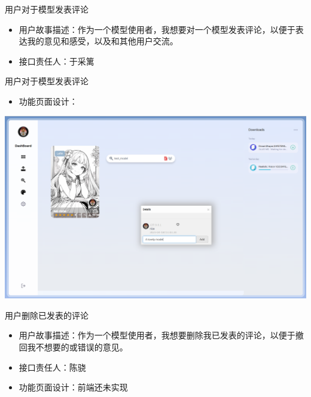 \begin{frame}{用户对于模型发表评论}
    \begin{itemize}
        \item 用户故事描述：作为一个模型使用者，我想要对一个模型发表评论，以便于表达我的意见和感受，以及和其他用户交流。
        \item 接口责任人：于采篱
    \end{itemize}
\end{frame}

\begin{frame}{用户对于模型发表评论}
    \begin{itemize}
        \item 功能页面设计：
    \end{itemize}
    \includegraphics[width=1\textwidth]{contents/figure/user_stories_demo_add_comment.png}
\end{frame}

\begin{frame}{用户删除已发表的评论}
    \begin{itemize}
        \item 用户故事描述：作为一个模型使用者，我想要删除我已发表的评论，以便于撤回我不想要的或错误的意见。
        \item 接口责任人：陈骁
        \item 功能页面设计：前端还未实现
    \end{itemize}
\end{frame}

